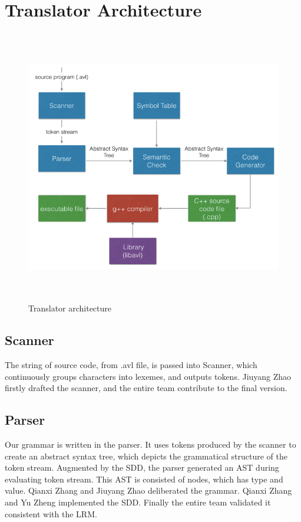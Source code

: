 \section{Translator Architecture}

\begin{figure}[htp]
  \centering
  \includegraphics[height=12cm]{architecture.png}
  \caption{Translator architecture}
  \label{fig:arch}
\end{figure}

\subsection{Scanner}
The string of source code, from .avl file, is passed into Scanner, which continuously groups
characters into lexemes, and outputs tokens. Jiuyang Zhao firstly drafted the scanner, and the
entire team contribute to the final version.

\subsection{Parser}
Our grammar is written in the parser. It uses tokens produced by the scanner to create an abstract
syntax tree, which depicts the grammatical structure of the token stream. Augmented by the SDD, the
parser generated an AST during evaluating token stream. This AST is consisted of nodes, which has
type and value. Qianxi Zhang and Jiuyang Zhao deliberated the grammar. Qianxi Zhang and Yu Zheng
implemented the SDD. Finally the entire team validated it consistent with the LRM.


